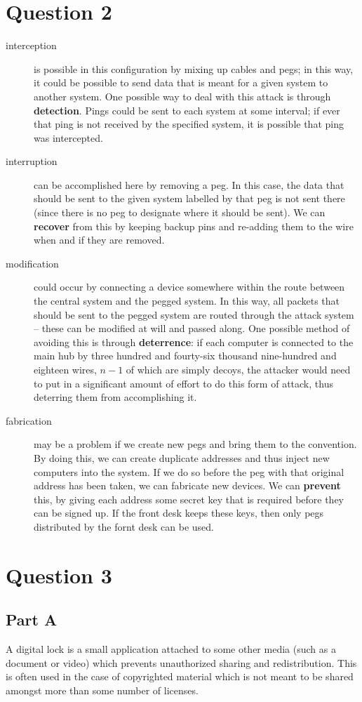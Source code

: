 \documentclass[12pt]{article}
\begin{document}
\section*{Question 2}
\begin{description}
\item[interception] is possible in this configuration by mixing up cables and pegs; in this way, it could be possible to send data that is meant for a given system to another system. One possible way to deal with this attack is through {\bf detection}. Pings could be sent to each system at some interval; if ever that ping is not received by the specified system, it is possible that ping was intercepted.
\item[interruption] can be accomplished here by removing a peg. In this case, the data that should be sent to the given system labelled by that peg is not sent there (since there is no peg to designate where it should be sent). We can {\bf recover} from this by keeping backup pins and re-adding them to the wire when and if they are removed.
\item[modification] could occur by connecting a device somewhere within the route between the central system and the pegged system. In this way, all packets that should be sent to the pegged system are routed through the attack system -- these can be modified at will and passed along. One possible method of avoiding this is through {\bf deterrence}: if each computer is connected to the main hub by three hundred and fourty-six thousand nine-hundred and eighteen wires, $n-1$ of which are simply decoys, the attacker would need to put in a significant amount of effort to do this form of attack, thus deterring them from accomplishing it.
\item[fabrication] may be a problem if we create new pegs and bring them to the convention. By doing this, we can create duplicate addresses and thus inject new computers into the system. If we do so before the peg with that original address has been taken, we can fabricate new devices. We can {\bf prevent} this, by giving each address some secret key that is required before they can be signed up. If the front desk keeps these keys, then only pegs distributed by the fornt desk can be used.
\end{description}

\section*{Question 3}
\subsection*{Part A}
A digital lock is a small application attached to some other media (such as a document or video) which prevents unauthorized sharing and redistribution. This is often used in the case of copyrighted material which is not meant to be shared amongst more than some number of licenses.
\end{document}
